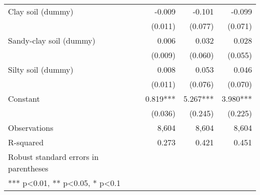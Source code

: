 \documentclass[
]{article}
\begin{document}
\begin{longtable}[t]{lrrr}
\addlinespace
Clay soil (dummy) & -0.009 & -0.101 & -0.099\\
 & (0.011) & (0.077) & (0.071)\\
Sandy-clay soil (dummy) & 0.006 & 0.032 & 0.028\\
 & (0.009) & (0.060) & (0.055)\\
Silty soil (dummy) & 0.008 & 0.053 & 0.046\\
\addlinespace
 & (0.011) & (0.076) & (0.070)\\
Constant & 0.819*** & 5.267*** & 3.980***\\
 & (0.036) & (0.245) & (0.225)\\
Observations & 8,604 & 8,604 & 8,604\\
R-squared & 0.273 & 0.421 & 0.451\\
\addlinespace
Robust standard errors in parentheses &  &  & \\
*** p<0.01, ** p<0.05, * p<0.1 &  &  & \\*
\end{longtable}
\endgroup{}

\newpage

\begingroup\fontsize{7}{9}\selectfont
\end{document}
